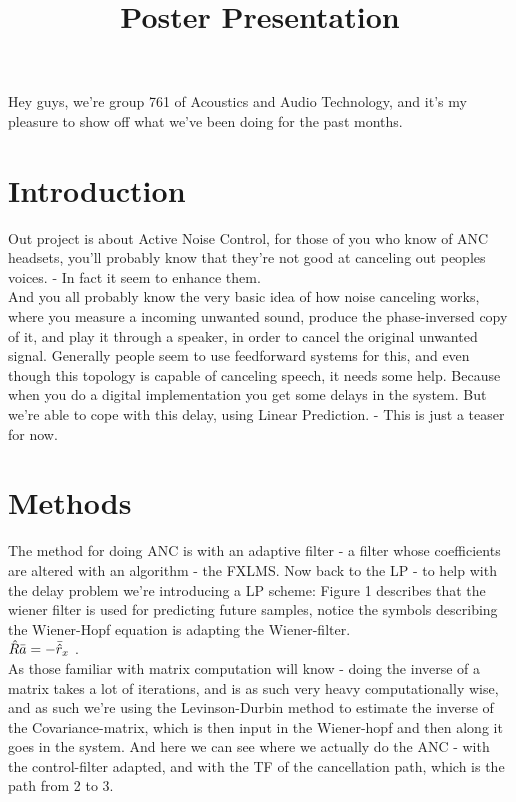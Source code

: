 \documentclass[12pt,a4paper,openright]{article}
\begin{document}
\title{Poster Presentation}

Hey guys, we're group 761 of Acoustics and Audio Technology, and it's my pleasure to show off what we've been doing for the past months.

\section{Introduction}	
Out project is about Active Noise Control, for those of you who know of ANC headsets, you'll probably know that they're not good at canceling out peoples voices.
 - In fact it seem to enhance them.\\
And you all probably know the very basic idea of how noise canceling works, where you measure a incoming unwanted sound, produce the phase-inversed copy of it, and play it through a speaker, in order to cancel the original unwanted signal.
Generally people seem to use feedforward systems for this, and even though this topology is capable of canceling speech, it needs some help. Because when you do a digital implementation you get some delays in the system. But we're able to cope with this delay, using Linear Prediction. - This is just a teaser for now.

\section{Methods}	
The method for doing ANC is with an adaptive filter - a filter whose coefficients are altered with an algorithm - the FXLMS.
Now back to the LP - to help with the delay problem we're introducing a LP scheme:
Figure 1 describes that the wiener filter is used for predicting future samples, notice the symbols describing the Wiener-Hopf equation is adapting the Wiener-filter.\\
$\Hat{R}\bar{a} = -\bar{\hat{r}}_x$ .\\
As those familiar with matrix computation will know - doing the inverse of a matrix takes a lot of iterations, and is as such very heavy computationally wise, and as such we're using the Levinson-Durbin method to estimate the inverse of the Covariance-matrix, which is then input in the Wiener-hopf and then along it goes in the system.
And here we can see where we actually do the ANC - with the control-filter adapted, and with the TF of the cancellation path, which is the path from 2 to 3.
	
\end{document}
